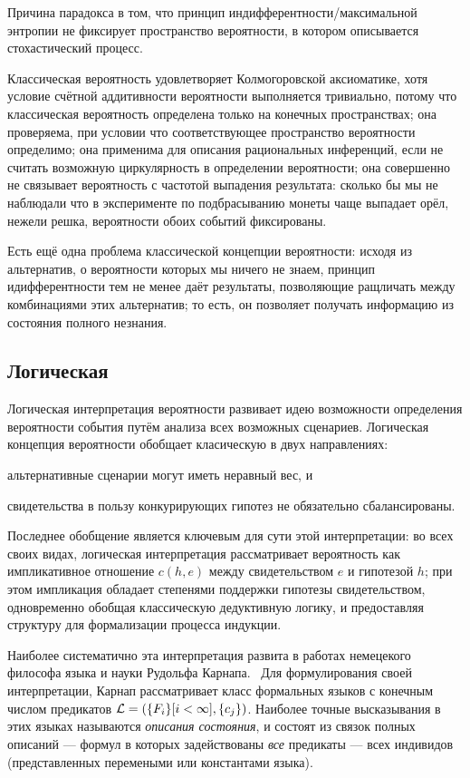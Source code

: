\documentclass[14pt, a4paper, pdftex]{extarticle}
\begin{document}
Причина парадокса в том, что принцип индифферентности/максимальной энтропии не фиксирует пространство вероятности, в котором описывается стохастический процесс.

Классическая вероятность удовлетворяет Колмогоровской аксиоматике, хотя условие счётной аддитивности вероятности выполняется тривиально, потому что классическая вероятность определена только на конечных пространствах; она проверяема, при условии что соответствующее пространство вероятности определимо; она применима для описания рациональных инференций, если не считать возможную циркулярность в определении вероятности; она совершенно не связывает вероятность с частотой выпадения результата: сколько бы мы не наблюдали что в эксперименте по подбрасыванию монеты чаще выпадает орёл, нежели решка, вероятности обоих событий фиксированы.

Есть ещё одна проблема классической концепции вероятности: исходя из альтернатив, о вероятности которых мы ничего не знаем, принцип идифферентности тем не менее даёт результаты, позволяющие ращличать между комбинациями этих альтернатив; то есть, он позволяет получать информацию из состояния полного незнания.

\subsection{Логическая}

Логическая интерпретация вероятности развивает идею возможности определения вероятности события путём анализа всех возможных сценариев. Логическая концепция вероятности обобщает класическую в двух направлениях:
\begin{inparaenum}[a)]
\item альтернативные сценарии могут иметь неравный вес, и
\item свидетельства в пользу конкурирующих гипотез не обязательно сбалансированы.
\end{inparaenum}

Последнее обобщение является ключевым для сути этой интерпретации: во всех своих видах, логическая интерпретация рассматривает вероятность как импликативное отношение $c(h, e)$ между свидетельством $e$ и гипотезой $h$; при этом импликация обладает степенями поддержки гипотезы свидетельством, одновременно обобщая классическую дедуктивную логику, и предоставляя структуру для формализации процесса индукции.

Наиболее систематично эта интерпретация развита в работах немецекого философа языка и науки Рудольфа Карнапа.~\cite{LogicalProbability} Для формулирования своей интерпретации, Карнап рассматривает класс формальных языков с конечным числом предикатов $\mathcal{L} = (\Set{F_i}[i<\infty], \Set{c_j})$. Наиболее точные высказывания в этих языках называются \emph{описания состояния}, и состоят из связок полных описаний --- формул в которых задействованы \emph{все} предикаты --- всех индивидов (представленных перемеными или константами языка).
\end{document}
